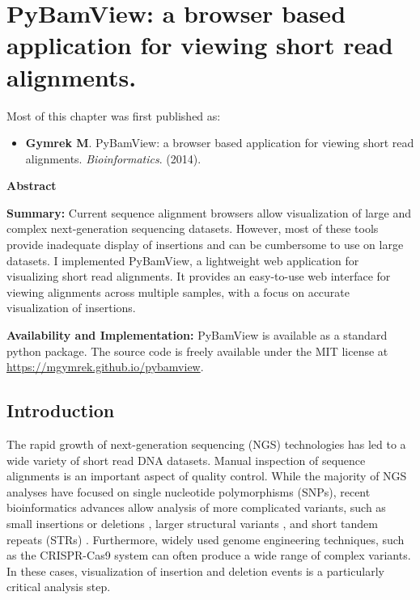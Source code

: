 \chapter{PyBamView: a browser based application for viewing short read alignments.}

\hzline

Most of this chapter was first published as:

\begin{itemize}
\item[] \textbf{Gymrek M}. PyBamView: a browser based application for viewing short read alignments. \emph{Bioinformatics}. (2014).
\end{itemize}

\hzline

\textbf{Abstract}

\textbf{Summary:} Current sequence alignment browsers allow visualization of large and complex next-generation sequencing datasets. However, most of these tools provide inadequate display of insertions and can be cumbersome to use on large datasets. I implemented PyBamView, a lightweight web application for visualizing short read alignments. It provides an easy-to-use web interface for viewing alignments across multiple samples, with a focus on accurate visualization of insertions.

\textbf{Availability and Implementation:} PyBamView is available as a standard python package. The source code is freely available under the MIT license at \url{https://mgymrek.github.io/pybamview}. 

\section{Introduction}

The rapid growth of next-generation sequencing (NGS) technologies has led to a wide variety of short read DNA datasets. Manual inspection of sequence alignments is an important aspect of quality control. While the majority of NGS analyses have focused on single nucleotide polymorphisms (SNPs), recent bioinformatics advances allow analysis of more complicated variants, such as small insertions or deletions \cite{MontgomeryGoodeKvikstadEtAl2013}, larger structural variants \cite{YeSchulzLongEtAl2009}, and short tandem repeats (STRs) \cite{HighnamFranckMartinEtAl2013,GymrekGolanRossetEtAl2012}. Furthermore, widely used genome engineering techniques, such as the CRISPR-Cas9 system \cite{CongRanCoxEtAl2013} can often produce a wide range of complex variants. In these cases, visualization of insertion and deletion events is a particularly critical analysis step.

